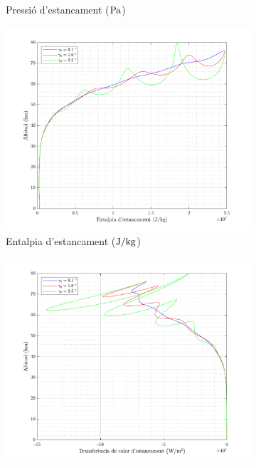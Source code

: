 \begin{figure}[ht]
\begin{subfigure}[t]{.33\textwidth}
        \caption{Pressió d'estancament ($\pascal$)}
    \end{subfigure}%
    \begin{subfigure}[t]{.33\textwidth}
        \centering
        \includegraphics[width=\linewidth]{imagenes/02_lifting_graficas/entalpia_estancament_no_title.pdf}
         \caption{Entalpia d'estancament ($\joule / \kilo\gram$)}
    \end{subfigure}
        \begin{subfigure}[t]{.33\textwidth}
        \centering
        \includegraphics[width=\linewidth]{imagenes/02_lifting_graficas/transferencia_calor_estancament_no_title.pdf}

\end{subfigure}
\end{figure}
